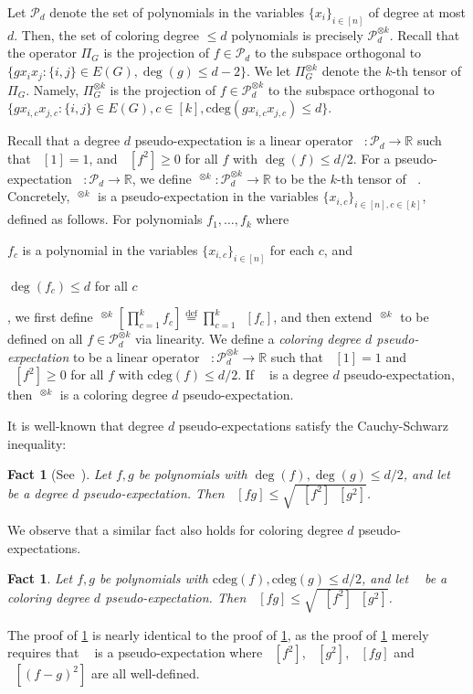\documentclass[10pt,a4paper]{article}
\newtheorem{fact}[theorem]{Fact}
\theoremstyle{definition}
\newcommand{\defeq}{\stackrel{\mathrm{def}}=}
\newcommand{\R}{\mathbb R}
\newcommand{\cP}{\mathcal P}
\DeclareMathOperator{\pE}{\tilde{\mathbb{E}}}
\def\defeq{\stackrel{\mathrm{def}}{=}}
\newcommand{\cdeg}{\mathrm{cdeg}}
\newcommand{\numcolors}{k}
\begin{document}
Let $\cP_d$ denote the set of polynomials in the variables $\{x_i\}_{i \in [n]}$ of degree at most $d$. Then, the set of coloring degree $\leq d$ polynomials is precisely $\cP_d^{\otimes \numcolors}$. Recall that the operator $\Pi_G$ is the projection of $f \in \cP_d$ to the subspace orthogonal to $\{g x_i x_j : \{i,j\} \in E(G), \deg(g) \leq d-2\}$. We let $\Pi_G^{\otimes \numcolors}$ denote the $\numcolors$-th tensor of $\Pi_G$. Namely, $\Pi_G^{\otimes \numcolors}$ is the projection of $f \in \cP_d^{\otimes \numcolors}$ to the subspace orthogonal to $\{g x_{i,c} x_{j,c} : \{i,j\} \in E(G), c \in [\numcolors], \cdeg(g x_{i,c} x_{j,c}) \leq d\}$. 

Recall that a degree $d$ pseudo-expectation is a linear operator $\pE \colon \cP_d \to \R$ such that $\pE[1] = 1$, and $\pE[f^2] \geq 0$ for all $f$ with $\deg(f) \leq d/2$. For a pseudo-expectation $\pE \colon \cP_d \to \R$, we define $\pE^{\otimes \numcolors} \colon \cP_d^{\otimes \numcolors} \to \R$ to be the $\numcolors$-th tensor of $\pE$. Concretely, $\pE^{\otimes \numcolors}$ is a pseudo-expectation in the variables $\{x_{i,c}\}_{i \in [n], c \in [\numcolors]}$, defined as follows. For polynomials $f_1, \dots, f_{\numcolors}$ where \begin{inparaenum}[(1)] \item $f_c$ is a polynomial in the variables $\{x_{i,c}\}_{i \in [n]}$ for each $c$, and \item $\deg(f_c) \leq d$ for all $c$\end{inparaenum}, we first define $\pE^{\otimes \numcolors}[\prod_{c = 1}^{\numcolors} f_c] \defeq \prod_{c = 1}^{\numcolors} \pE[f_c]$, and then extend $\pE^{\otimes \numcolors}$ to be defined on all $f \in \cP_d^{\otimes \numcolors}$ via linearity. We define a \emph{coloring degree $d$ pseudo-expectation} to be a linear operator $\pE \colon \cP_d^{\otimes \numcolors} \to \R$ such that $\pE[1] = 1$ and $\pE[f^2] \geq 0$ for all $f$ with $\cdeg(f) \leq d/2$. If $\pE$ is a degree $d$ pseudo-expectation, then $\pE^{\otimes \numcolors}$ is a coloring degree $d$ pseudo-expectation.

It is well-known that degree $d$ pseudo-expectations satisfy the Cauchy-Schwarz inequality:
\begin{fact}[See~\cite{BarakS16}]
\label{fact:cauchyschwarz}
Let $f,g$ be polynomials with $\deg(f), \deg(g) \leq d/2$, and let $\pE$ be a degree $d$ pseudo-expectation. Then $\pE[f g] \leq \sqrt{\pE[f^2] \pE[g^2]}$.
\end{fact}
We observe that a similar fact also holds for coloring degree $d$ pseudo-expectations.
\begin{fact}
\label{fact:cauchyschwarzcdeg}
Let $f,g$ be polynomials with $\cdeg(f), \cdeg(g) \leq d/2$, and let $\pE$ be a coloring degree $d$ pseudo-expectation. Then $\pE[f g] \leq \sqrt{\pE[f^2] \pE[g^2]}$.
\end{fact}
The proof of \cref{fact:cauchyschwarzcdeg} is nearly identical to the proof of \cref{fact:cauchyschwarz}, as the proof of \cref{fact:cauchyschwarz} merely requires that $\pE$ is a pseudo-expectation where $\pE[f^2]$, $\pE[g^2]$, $\pE[fg]$ and $\pE[(f-g)^2]$ are all well-defined.
\end{document}
